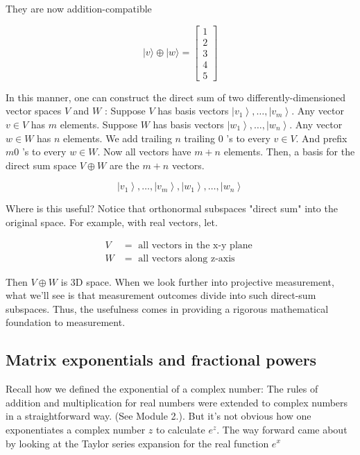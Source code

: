 \documentclass[main.tex]{subfiles}
\begin{document}
    They are now addition-compatible
    
    $$
    |v\rangle \oplus|w\rangle=\left[\begin{array}{l}
    1 \\
    2 \\
    3 \\
    4 \\
    5
    \end{array}\right]
    $$
    
    In this manner, one can construct the direct sum of two differently-dimensioned vector spaces $V$ and $W$ : Suppose $V$ has basis vectors $\left|v_{1}\right\rangle, \ldots,\left|v_{m}\right\rangle$. Any vector $v \in V$ has $m$ elements. Suppose $W$ has basis vectors $\left|w_{1}\right\rangle, \ldots,\left|w_{n}\right\rangle$. Any vector $w \in W$ has $n$ elements. We add trailing $n$ trailing 0 's to every $v \in V$. And prefix $m 0$ 's to every $w \in W$. Now all vectors have $m+n$ elements. Then, a basis for the direct sum space $V \oplus W$ are the $m+n$ vectors.
    
    $$
    \left|v_{1}\right\rangle, \ldots,\left|v_{m}\right\rangle,\left|w_{1}\right\rangle, \ldots,\left|w_{n}\right\rangle
    $$
    
    Where is this useful? Notice that orthonormal subspaces "direct sum" into the original space. For example, with real vectors, let.
    
    $$
    \begin{aligned}
    V &=\text { all vectors in the } \mathrm{x} \text {-y plane } \\
    W &=\text { all vectors along } \mathrm{z} \text {-axis }
    \end{aligned}
    $$
    
    Then $V \oplus W$ is 3D space. When we look further into projective measurement, what we'll see is that measurement outcomes divide into such direct-sum subspaces. Thus, the usefulness comes in providing a rigorous mathematical foundation to measurement.

\subsection{Matrix exponentials and fractional powers}

    Recall how we defined the exponential of a complex number: The rules of addition and multiplication for real numbers were extended to complex numbers in a straightforward way. (See Module 2.). But it's not obvious how one exponentiates a complex number $z$ to calculate $e^{z}$. The way forward came about by looking at the Taylor series expansion for the real function $e^{x}$
    
\end{document}
